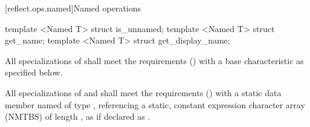 [reflect.ops.named]{Named operations}

\begin{std.txt}\color{addclr}

\begin{itemdecl}
template <Named T> struct is_unnamed;
template <Named T> struct get_name;
template <Named T> struct get_display_name;
\end{itemdecl}

\begin{itemdescr}
\pnum
All specializations of  shall meet the  requirements () with a base characteristic as specified below.

\pnum
All specializations of  and  shall meet the  requirements () with a static data member named  of type , referencing a static, constant expression character array (NMTBS) of length , as if declared as .


\end{itemdescr}
\end{std.txt}
